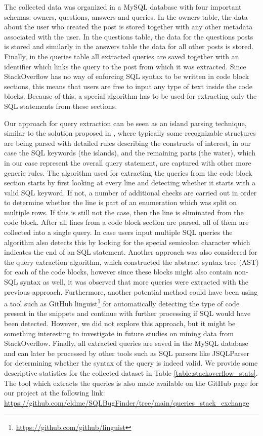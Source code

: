 The collected data was organized in a MySQL database with four important schemas: owners, questions, answers and queries. In the owners table, the data about the user who created the post is stored together with any other metadata associated with the user. In the questions table, the data for the questions posts is stored and similarly in the answers table the data for all other posts is stored. Finally, in the queries table all extracted queries are saved together with an identifier which links the query to the post from which it was extracted. Since StackOverflow has no way of enforcing SQL syntax to be written in code block sections, this means that users are free to input any type of text inside the code blocks. Because of this, a special algorithm has to be used for extracting only the SQL statements from these sections.

Our approach for query extraction can be seen as an island parsing technique, similar to the solution proposed in \citet{P028}, where typically some recognizable structures are being parsed with detailed rules describing the constructs of interest, in our case the SQL keywords (the islands), and the remaining parts (the water), which in our case represent the overall query statement, are captured with other more generic rules. The algorithm used for extracting the queries from the code block section starts by first looking at every line and detecting whether it starts with a valid SQL keyword. If not, a number of additional checks are carried out in order to determine whether the line is part of an enumeration which was split on multiple rows. If this is still not the case, then the line is eliminated from the code block. After all lines from a code block section are parsed, all of them are collected into a single query. In case users input multiple SQL queries the algorithm also detects this by looking for the special semicolon character which indicates the end of an SQL statement. Another approach was also considered for the query extraction algorithm, which constructed the abstract syntax tree (AST) for each of the code blocks, however since these blocks might also contain non-SQL syntax as well, it was observed that more queries were extracted with the previous approach. Furthermore, another potential method could have been using a tool such as GitHub linguist\footnote{\url{https://github.com/github/linguist}} for automatically detecting the type of code present in the snippets and continue with further processing if SQL would have been detected. However, we did not explore this approach, but it might be something interesting to investigate in future studies on mining data from StackOverflow. Finally, all extracted queries are saved in the MySQL database and can later be processed by other tools such as SQL parsers like JSQLParser for determining whether the syntax of the query is indeed valid. We provide some descriptive statistics for the collected dataset in Table \ref{table:stackoverflow_stats}. The tool which extracts the queries is also made available on the GitHub page for our project at the following link: \url{https://github.com/cldme/SQLBugFinder/tree/main/queries_stack_exchange}

